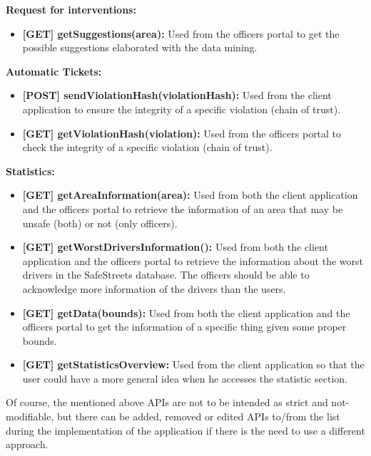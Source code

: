 \textbf{Request for interventions:}
\begin{itemize}
	\item \textbf{[GET] getSuggestions(area):} Used from the officers portal to get the possible suggestions elaborated with the data mining.
\end{itemize}

\textbf{Automatic Tickets:}
\begin{itemize}
	\item \textbf{[POST] sendViolationHash(violationHash):}  Used from the client application to ensure the integrity of a specific violation (chain of trust). 
	\item \textbf{[GET] getViolationHash(violation):}  Used from the officers portal to check the integrity of a specific violation (chain of trust). 
\end{itemize}

\textbf{Statistics:}
\begin{itemize}
	\item \textbf{[GET] getAreaInformation(area):} Used from both the client application and the officers portal to retrieve the information of an area that may be unsafe (both) or not (only officers).
	\item \textbf{[GET] getWorstDriversInformation():} Used from both the client application and the officers portal to retrieve the information about the worst drivers in the SafeStreets database. The officers should be able to acknowledge more information of the drivers than the users.
	\item \textbf{[GET] getData(bounds):} Used from both the client application and the officers portal to get the information of a specific thing given some proper bounds.
	\item \textbf{[GET] getStatisticsOverview:} Used from the client application so that the user could have a more general idea when he accesses the statistic section.
\end{itemize}

Of course, the mentioned above APIs are not to be intended as strict and not-modifiable, but there can be added, removed or edited APIs to/from the list during the implementation of the application if there is the need to use a different approach.


